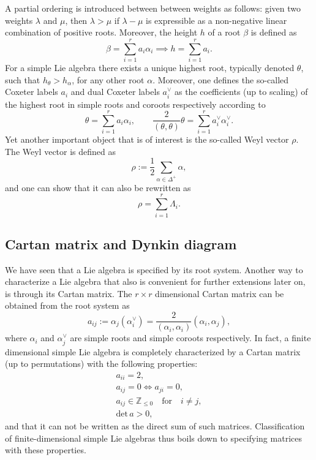 A partial ordering is introduced between between weights as follows: given two weights $\lambda$ and $\mu$, then $\lambda>\mu$ if $\lambda-\mu$ is expressible as a non-negative linear combination of positive roots. Moreover, the height $h$ of a root $\beta$ is defined as 
\begin{equation}
    \beta = \sum_{i=1}^ra_i\alpha_i\implies h = \sum_{i=1}^r a_i.
\end{equation}
For a simple Lie algebra there exists a unique highest root, typically denoted $\theta$, such that $h_\theta>h_\alpha$, for any other root $\alpha$. Moreover, one defines the so-called Coxeter labels $a_i$ and dual Coxeter labels $a_i^\vee$ as the coefficients (up to scaling) of the highest root in simple roots and coroots respectively according to
\begin{equation}
    \theta = \sum_{i=1}^ra_i\alpha_{i},\qquad \frac{2}{(\theta,\theta)}\theta = \sum_{i=1}^r a_i^\vee \alpha_{i}^{\vee}.
\end{equation}
Yet another important object that is of interest is the so-called Weyl vector $\rho$. The Weyl vector is defined as
\begin{equation}
    \rho := \frac{1}{2}\sum_{\alpha\in\Delta^+}\alpha,
\end{equation}
and one can show that it can also be rewritten as
\begin{equation}
    \rho = \sum_{i=1}^r \Lambda_{i}.
\end{equation}

\subsection{Cartan matrix and Dynkin diagram}
We have seen that a Lie algebra is specified by its root system. Another way to characterize a Lie algebra that also is convenient for further extensions later on, is through its Cartan matrix. The $r\times r$ dimensional Cartan matrix can be obtained from the root system as
\begin{equation}\label{eq:CartanFirst}
    a_{ij} := \alpha_j(\alpha_{i}^\vee)  = \frac{2}{(\alpha_{i},\alpha_{i})}(\alpha_{i},\alpha_{j}),
\end{equation}
where $\alpha_{i}$ and $\alpha_{j}^{\vee}$ are simple roots and simple coroots respectively. In fact, a finite dimensional simple Lie algebra is completely characterized by a Cartan matrix (up to permutations) with the following properties:
\begin{equation}\label{eq:Cartanprop}
    \begin{aligned}
        a_{ii} = 2,\\
        a_{ij} = 0 \Longleftrightarrow a_{ji} = 0,\\
        a_{ij}\in \mathbb{Z}_{\leq 0} \quad\text{for}\quad i\neq j,\\
        \text{det}\, a >0,
    \end{aligned}
\end{equation}
and that it can not be written as the direct sum of such matrices. Classification of finite-dimensional simple Lie algebras thus boils down to specifying matrices with these properties. 


